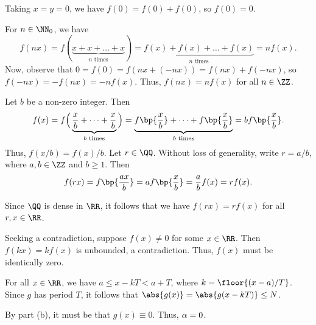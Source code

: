 \begin{solution}
    \begin{ppart}
        \begin{psubpart}
            Taking $x = y = 0$, we have $f(0) = f(0) + f(0)$, so $f(0) = 0$.
        \end{psubpart}
        \begin{psubpart}
            For $n \in \NN_0$, we have \[f(nx) = f(\underbrace{x + x + \dots + x}_{\text{$n$ times}}) = \underbrace{f(x) + f(x) + \dots + f(x)}_{\text{$n$ times}} = nf(x).\] Now, observe that $0 = f(0) = f(nx + (-nx)) = f(nx) + f(-nx)$, so $f(-nx) = -f(nx) = -nf(x)$. Thus, $f(nx) = nf(x)$ for all $n \in \ZZ$.
        \end{psubpart}
        \begin{psubpart}
            Let $b$ be a non-zero integer. Then \[f(x) = f\Big(\underbrace{\frac{x}{b} + \dots + \frac{x}{b}}_{\text{$b$ times}}\Big) = \underbrace{f\bp{\frac{x}{b}} + \dots + f\bp{\frac{x}{b}}}_{\text{$b$ times}} = b f\bp{\frac{x}{b}}.\] Thus, $f(x/b) = f(x)/b$. Let $r \in \QQ$. Without loss of generality, write $r = a/b$, where $a, b \in \ZZ$ and $b \geq 1$. Then \[f(rx) = f\bp{\frac{ax}{b}} = a f\bp{\frac{x}{b}} = \frac{a}{b} f(x) = rf(x).\]
        \end{psubpart}
        \begin{psubpart}
            Since $\QQ$ is dense in $\RR$, it follows that we have $f(rx) = rf(x)$ for all $r, x \in \RR$.
        \end{psubpart}
    \end{ppart}
    \begin{ppart}
        Seeking a contradiction, suppose $f(x) \neq 0$ for some $x \in \RR$. Then $f(kx) = kf(x)$ is unbounded, a contradiction. Thus, $f(x)$ must be identically zero.
    \end{ppart}
    \begin{ppart}
        For all $x \in \RR$, we have $a \leq x - kT < a + T$, where $k = \floor{(x-a)/T}$. Since $g$ has period $T$, it follows that $\abs{g(x)} = \abs{g(x-kT)} \leq N$.
    \end{ppart}
    \begin{ppart}
        By part (b), it must be that $g(x) \equiv 0$. Thus, $\alpha = 0$.
    \end{ppart}
\end{solution}
